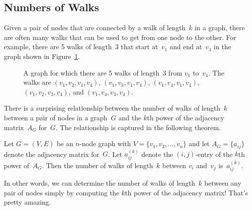 \subsection{Numbers of Walks}

Given a pair of nodes that are connected by a walk of length~$k$ in a
graph, there are often many walks that can be used to get from one
node to the other.  For example, there are 5 walks of length~3 that
start at~$v_1$ and end at~$v_4$ in the graph shown in
Figure~\ref{fig:5AD}.

\begin{figure}[h]

\missinggraphic

\caption{A graph for which there are 5 walks of length~3 from $v_1$
  to~$v_4$.  The walks are $(v_1, v_2, v_1, v_4)$, $(v_1, v_3, v_1,
  v_4)$, $(v_1, v_4, v_1, v_4)$, $(v_1, v_2, v_3, v_4)$, and $(v_1,
  v_4, v_3, v_4)$.}
\label{fig:5AD}
\end{figure}

There is a surprising relationship between the number of walks of
length~$k$ between a pair of nodes in a graph~$G$ and the $k$th power
of the adjacency matrix~$A_G$ for~$G$.  The relationship is captured
in the following theorem.

\begin{theorem}\label{thm:5AE}
Let $G = (V, E)$ be an $n$-node graph with $V = \{ v_1, v_2, \dots,
v_n \}$ and let $A_G = \{ a_{ij} \}$ denote the adjacency matrix
for~$G$.  Let $a_{ij}^{(k)}$ denote the $(i, j)$-entry of the $k$th
power of~$A_G$.  Then the number of walks of length~$k$ between $v_i$
and~$v_j$ is~$a_{ij}^{(k)}$.
\end{theorem}

In other words, we can determine the number of walks of length~$k$
between any pair of nodes simply by computing the $k$th power of the
adjacency matrix!  That's pretty amazing.


